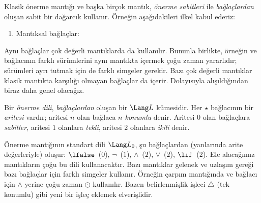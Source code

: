 \documentclass[../../../include/open-logic-section]{subfiles}
\begin{document}


Klasik önerme mantığı ve başka birçok mantık, \emph{önerme sabitleri} ile
\emph{bağlaçlardan} oluşan sabit bir dağarcık kullanır. Örneğin
aşağıdakileri ilkel kabul ederiz:
\begin{enumerate}
\item Mantıksal bağlaçlar:
  \startycommalist
\end{enumerate}

Aynı bağlaçlar çok değerli mantıklarda da kullanılır. Bununla birlikte,
örneğin ve bağlacının farklı sürümlerini aynı mantıkta içermek çoğu zaman
yararlıdır; sürümleri ayrı tutmak için de farklı simgeler gerekir. Bazı çok
değerli mantıklar klasik mantıkta karşılığı olmayan bağlaçlar da içerir.
Dolayısıyla alışıldığından biraz daha genel olacağız.

\begin{defn}
Bir \emph{önerme dili}, \emph{bağlaçlardan} oluşan bir $\Lang L$ kümesidir.
Her $\star$ bağlacının bir \emph{aritesi} vardır; aritesi $n$ olan bağlaca
\emph{$n$-konumlu} denir. Aritesi $0$ olan bağlaçlara \emph{sabitler},
aritesi $1$ olanlara \emph{tekli}, aritesi $2$ olanlara \emph{ikili} denir.
\end{defn}

\begin{ex}
Önerme mantığının standart dili $\Lang L_0$, şu bağlaçlardan (yanlarında
arite değerleriyle) oluşur: $\lfalse$~($0$), $\lnot$~($1$),
$\land$~($2$), $\lor$~($2$), $\lif$~($2$). Ele alacağımız mantıkların çoğu
bu dili kullanacaktır. Bazı mantıklar gelenek ve uzlaşım gereği bazı
bağlaçlar için farklı simgeler kullanır. Örneğin çarpım mantığında ve bağlacı
için $\land$ yerine çoğu zaman $\odot$ kullanılır. Bazen belirlenmişlik
işleci $\triangle$ (tek konumlu) gibi yeni bir işleç eklemek elverişlidir.
\end{ex}
\end{document}
